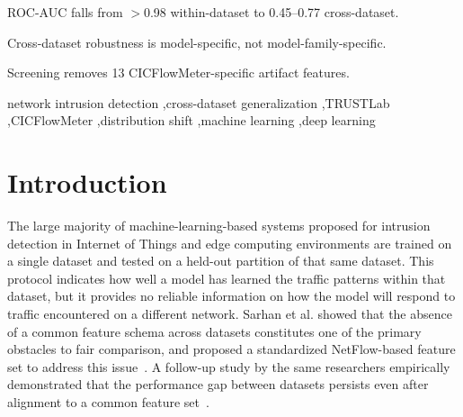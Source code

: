 \documentclass[a4paper,fleqn]{cas-sc}
\begin{document}
\begin{highlights}
\item ROC-AUC falls from $>$0.98 within-dataset to 0.45--0.77 cross-dataset.
\item Cross-dataset robustness is model-specific, not model-family-specific.
\item Screening removes 13 CICFlowMeter-specific artifact features.
\end{highlights}

\begin{keywords}
network intrusion detection \sep cross-dataset generalization \sep TRUSTLab \sep CICFlowMeter \sep distribution shift \sep machine learning \sep deep learning
\end{keywords}

\maketitle

\section{Introduction}
\label{sec:intro}

The large majority of machine-learning-based systems proposed for intrusion detection in Internet of Things and edge computing environments are trained on a single dataset and tested on a held-out partition of that same dataset. This protocol indicates how well a model has learned the traffic patterns within that dataset, but it provides no reliable information on how the model will respond to traffic encountered on a different network. Sarhan et al. showed that the absence of a common feature schema across datasets constitutes one of the primary obstacles to fair comparison, and proposed a standardized NetFlow-based feature set to address this issue~\cite{Sarhan2022a}. A follow-up study by the same researchers empirically demonstrated that the performance gap between datasets persists even after alignment to a common feature set~\cite{Sarhan2022b}.
\end{document}
